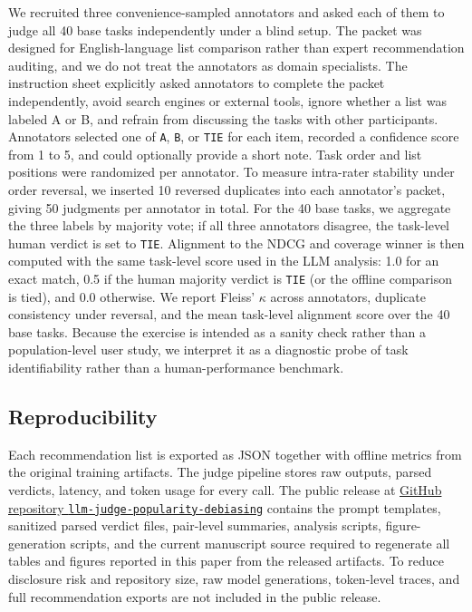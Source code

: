 \documentclass[pdflatex,sn-basic,referee,lineno]{sn-jnl}
\begin{document}
We recruited three convenience-sampled annotators and asked each of them to judge all 40 base tasks independently under a blind setup. The packet was designed for English-language list comparison rather than expert recommendation auditing, and we do not treat the annotators as domain specialists. The instruction sheet explicitly asked annotators to complete the packet independently, avoid search engines or external tools, ignore whether a list was labeled A or B, and refrain from discussing the tasks with other participants. Annotators selected one of \texttt{A}, \texttt{B}, or \texttt{TIE} for each item, recorded a confidence score from 1 to 5, and could optionally provide a short note. Task order and list positions were randomized per annotator. To measure intra-rater stability under order reversal, we inserted 10 reversed duplicates into each annotator's packet, giving 50 judgments per annotator in total. For the 40 base tasks, we aggregate the three labels by majority vote; if all three annotators disagree, the task-level human verdict is set to \texttt{TIE}. Alignment to the NDCG and coverage winner is then computed with the same task-level score used in the LLM analysis: 1.0 for an exact match, 0.5 if the human majority verdict is \texttt{TIE} (or the offline comparison is tied), and 0.0 otherwise. We report Fleiss' $\kappa$ across annotators, duplicate consistency under reversal, and the mean task-level alignment score over the 40 base tasks. Because the exercise is intended as a sanity check rather than a population-level user study, we interpret it as a diagnostic probe of task identifiability rather than a human-performance benchmark.

\subsection{Reproducibility}

Each recommendation list is exported as JSON together with offline metrics from the original training artifacts. The judge pipeline stores raw outputs, parsed verdicts, latency, and token usage for every call. The public release at \href{https://github.com/niyaobuyaochibl/llm-judge-popularity-debiasing}{GitHub repository \texttt{llm-judge-popularity-debiasing}} contains the prompt templates, sanitized parsed verdict files, pair-level summaries, analysis scripts, figure-generation scripts, and the current manuscript source required to regenerate all tables and figures reported in this paper from the released artifacts. To reduce disclosure risk and repository size, raw model generations, token-level traces, and full recommendation exports are not included in the public release.
\end{document}
